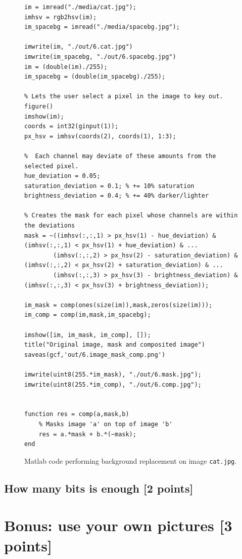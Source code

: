 \documentclass[tikz,14pt,fleqn]{article}
\begin{document}
\begin{figure}[h!]
    \begin{verbatim} 
im = imread("./media/cat.jpg");
imhsv = rgb2hsv(im);
im_spacebg = imread("./media/spacebg.jpg");

imwrite(im, "./out/6.cat.jpg")
imwrite(im_spacebg, "./out/6.spacebg.jpg")
im = (double(im)./255);
im_spacebg = (double(im_spacebg)./255);

% Lets the user select a pixel in the image to key out.
figure()
imshow(im);
coords = int32(ginput(1));
px_hsv = imhsv(coords(2), coords(1), 1:3);

%  Each channel may deviate of these amounts from the selected pixel.
hue_deviation = 0.05;
saturation_deviation = 0.1; % += 10% saturation
brightness_deviation = 0.4; % += 40% darker/lighter

% Creates the mask for each pixel whose channels are within the deviations
mask = ~((imhsv(:,:,1) > px_hsv(1) - hue_deviation) & (imhsv(:,:,1) < px_hsv(1) + hue_deviation) & ...
        (imhsv(:,:,2) > px_hsv(2) - saturation_deviation) & (imhsv(:,:,2) < px_hsv(2) + saturation_deviation) & ...
        (imhsv(:,:,3) > px_hsv(3) - brightness_deviation) & (imhsv(:,:,3) < px_hsv(3) + brightness_deviation));

im_mask = comp(ones(size(im)),mask,zeros(size(im)));
im_comp = comp(im,mask,im_spacebg);

imshow([im, im_mask, im_comp], []);
title("Original image, mask and composited image")
saveas(gcf,'out/6.image_mask_comp.png')

imwrite(uint8(255.*im_mask), "./out/6.mask.jpg");
imwrite(uint8(255.*im_comp), "./out/6.comp.jpg");


function res = comp(a,mask,b)
    % Masks image 'a' on top of image 'b'
    res = a.*mask + b.*(~mask);
end
    \end{verbatim}
\caption{Matlab code performing background replacement on image \texttt{cat.jpg}.}
\end{figure}




\subsection{How many bits is enough [2 points]}


\section{Bonus: use your own pictures [3 points]}
\end{document}
